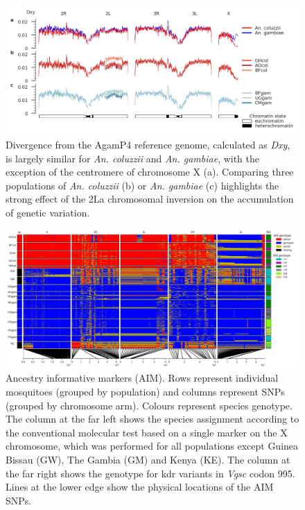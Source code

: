 \documentclass[a4paper,11pt,abstracton,hidelinks]{scrartcl}
\begin{document}
\begin{figure}[H]
	\begin{center}
		\includegraphics*[width=6.3in]{notebooks/refdiff/refdiff_phase2_combined.jpg}
	\end{center}
	\caption{Divergence from the AgamP4 reference genome, calculated as \textit{Dxy}, is largely similar for \textit{An. coluzzii} and \textit{An. gambiae}, with the exception of the centromere of chromosome X (a). Comparing three populations of \textit{An. coluzzii} (b) or \textit{An. gambiae} (c) highlights the strong effect of the 2La chromosomal inversion on the accumulation of genetic variation.}
	\label{refdiff}
\end{figure}

\clearpage

\begin{figure}[H]
	\begin{center}
		\includegraphics*[width=6.3in]{artwork/AIM_figure_scaled.jpg}
	\end{center}
	\caption{Ancestry informative markers (AIM). Rows represent individual mosquitoes (grouped by population) and columns represent SNPs (grouped by chromosome arm). Colours represent species genotype. The column at the far left shows the species assignment according to the conventional molecular test based on a single marker on the X chromosome, which was performed for all populations except Guinea Bissau (GW), The Gambia (GM) and Kenya (KE). The column at the far right shows the genotype for kdr variants in \textit{Vgsc} codon 995. Lines at the lower edge show the physical locations of the AIM SNPs.}
	\label{aim}
\end{figure}
\end{document}
